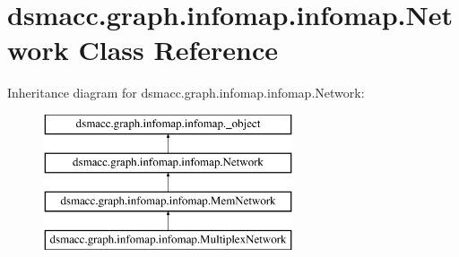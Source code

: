 \hypertarget{classdsmacc_1_1graph_1_1infomap_1_1infomap_1_1Network}{}\section{dsmacc.\+graph.\+infomap.\+infomap.\+Network Class Reference}
\label{classdsmacc_1_1graph_1_1infomap_1_1infomap_1_1Network}
Inheritance diagram for dsmacc.\+graph.\+infomap.\+infomap.\+Network\+:\begin{figure}[H]
\begin{center}
\leavevmode
\includegraphics[height=4.000000cm]{classdsmacc_1_1graph_1_1infomap_1_1infomap_1_1Network}
\end{center}
\end{figure}
